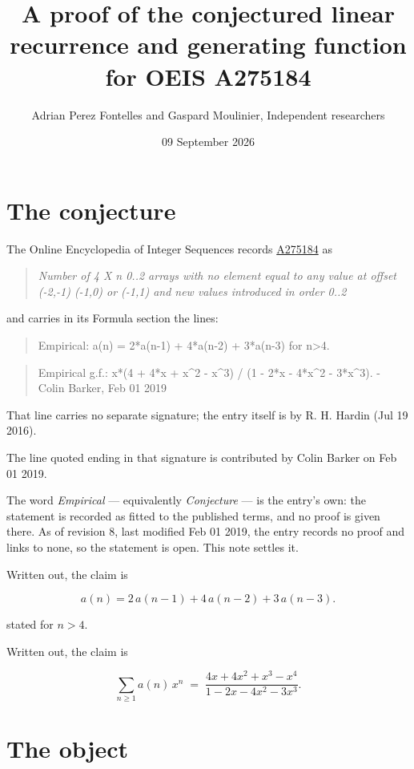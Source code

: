 \documentclass[11pt]{article}
\title{A proof of the conjectured linear recurrence and generating function for OEIS A275184}
\author{Adrian Perez Fontelles and Gaspard Moulinier, Independent researchers}
\date{09 September 2026}
\theoremstyle{definition}
\begin{document}
\maketitle
\section{The conjecture}

The Online Encyclopedia of Integer Sequences records \href{https://oeis.org/A275184}{A275184} as

\begin{quote}\itshape Number of 4 X n 0..2 arrays with no element equal to any value at offset (-2,-1) (-1,0) or (-1,1) and new values introduced in order 0..2\end{quote}

and carries in its Formula section the lines:

\begin{quote}\ttfamily Empirical: a(n) = 2*a(n-1) + 4*a(n-2) + 3*a(n-3) for n>4.\end{quote}

\begin{quote}\ttfamily Empirical g.f.: x*(4 + 4*x + x\textasciicircum{}2 - x\textasciicircum{}3) / (1 - 2*x - 4*x\textasciicircum{}2 - 3*x\textasciicircum{}3). - Colin Barker, Feb 01 2019\end{quote}

That line carries no separate signature; the entry itself is by R. H. Hardin (Jul 19 2016).

The line quoted ending in that signature is contributed by Colin Barker on Feb 01 2019.

The word {\itshape Empirical} --- equivalently {\itshape Conjecture} --- is the entry's own: the statement is recorded as fitted to the published terms, and no proof is given there. As of revision 8, last modified Feb 01 2019, the entry records no proof and links to none, so the statement is open. This note settles it.

Written out, the claim is

\[a(n) = 2\,a(n-1) + 4\,a(n-2) + 3\,a(n-3).\]

stated for $n > 4$.

Written out, the claim is

\[\sum_{n \ge 1} a(n)\,x^n \;=\; \frac{4x + 4x^{2} + x^{3} - x^{4}}{1 - 2x - 4x^{2} - 3x^{3}}.\]

\section{The object}
\end{document}
